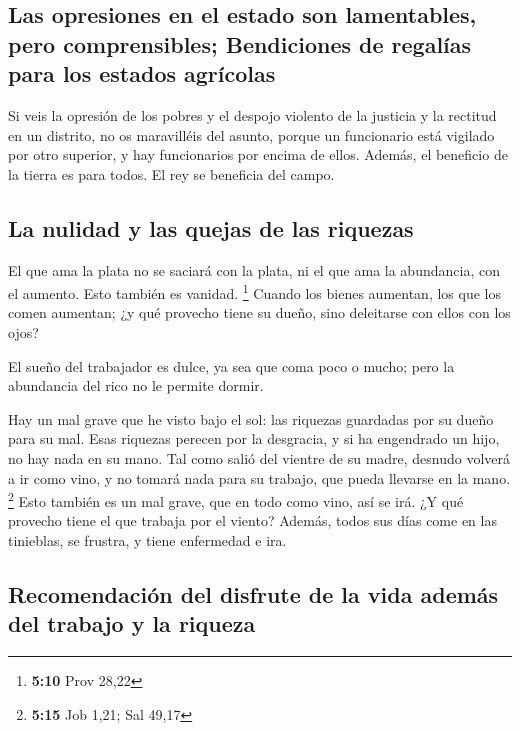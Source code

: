 \hypertarget{las-opresiones-en-el-estado-son-lamentables-pero-comprensibles-bendiciones-de-regaluxedas-para-los-estados-agruxedcolas}{%
\subsection{Las opresiones en el estado son lamentables, pero
comprensibles; Bendiciones de regalías para los estados
agrícolas}\label{las-opresiones-en-el-estado-son-lamentables-pero-comprensibles-bendiciones-de-regaluxedas-para-los-estados-agruxedcolas}}

 Si veis la opresión de los pobres y el despojo violento
de la justicia y la rectitud en un distrito, no os maravilléis del
asunto, porque un funcionario está vigilado por otro superior, y hay
funcionarios por encima de ellos.  Además, el beneficio de
la tierra es para todos. El rey se beneficia del campo.

\hypertarget{la-nulidad-y-las-quejas-de-las-riquezas}{%
\subsection{La nulidad y las quejas de las
riquezas}\label{la-nulidad-y-las-quejas-de-las-riquezas}}

 El que ama la plata no se saciará con la plata, ni el
que ama la abundancia, con el aumento. Esto también es vanidad.
\footnote{\textbf{5:10} Prov 28,22}  Cuando los bienes
aumentan, los que los comen aumentan; ¿y qué provecho tiene su dueño,
sino deleitarse con ellos con los ojos?

 El sueño del trabajador es dulce, ya sea que coma poco o
mucho; pero la abundancia del rico no le permite dormir.

 Hay un mal grave que he visto bajo el sol: las riquezas
guardadas por su dueño para su mal.  Esas riquezas
perecen por la desgracia, y si ha engendrado un hijo, no hay nada en su
mano.  Tal como salió del vientre de su madre, desnudo
volverá a ir como vino, y no tomará nada para su trabajo, que pueda
llevarse en la mano. \footnote{\textbf{5:15} Job 1,21; Sal 49,17}
 Esto también es un mal grave, que en todo como vino, así
se irá. ¿Y qué provecho tiene el que trabaja por el viento?
 Además, todos sus días come en las tinieblas, se
frustra, y tiene enfermedad e ira.

\hypertarget{recomendaciuxf3n-del-disfrute-de-la-vida-ademuxe1s-del-trabajo-y-la-riqueza}{%
\subsection{Recomendación del disfrute de la vida además del trabajo y
la
riqueza}\label{recomendaciuxf3n-del-disfrute-de-la-vida-ademuxe1s-del-trabajo-y-la-riqueza}}

